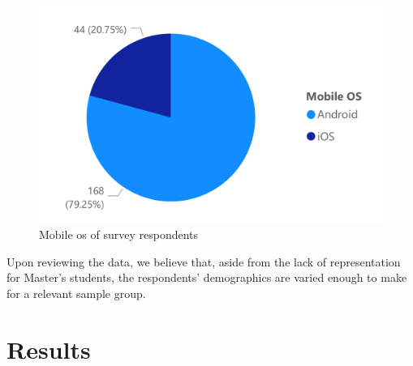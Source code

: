\begin{figure}[ht]
    \centering
         \includegraphics[height=0.2\textheight]{figures/charts/survey/os.pdf}
    \caption{Mobile \acrshort{os} of survey respondents}
    \label{3:fig:os}
\end{figure}

Upon reviewing the data, we believe that, aside from the lack of representation for Master's students, the respondents' demographics are varied enough to make for a relevant sample group.

\section{Results} \label{3:results}